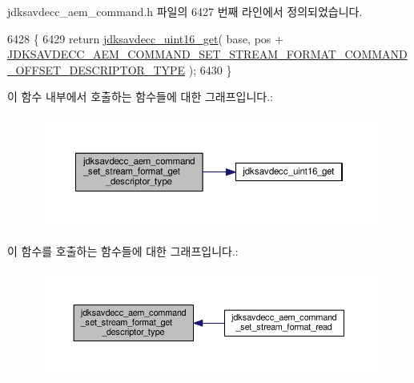 jdksavdecc\+\_\+aem\+\_\+command.\+h 파일의 6427 번째 라인에서 정의되었습니다.


\begin{DoxyCode}
6428 \{
6429     \textcolor{keywordflow}{return} \hyperlink{group__endian_ga3fbbbc20be954aa61e039872965b0dc9}{jdksavdecc\_uint16\_get}( base, pos + 
      \hyperlink{group__command__set__stream__format_ga25da528fd42f5ef79193b65ef514b56c}{JDKSAVDECC\_AEM\_COMMAND\_SET\_STREAM\_FORMAT\_COMMAND\_OFFSET\_DESCRIPTOR\_TYPE}
       );
6430 \}
\end{DoxyCode}


이 함수 내부에서 호출하는 함수들에 대한 그래프입니다.\+:
\nopagebreak
\begin{figure}[H]
\begin{center}
\leavevmode
\includegraphics[width=350pt]{group__command__set__stream__format_ga50d425d359f8e2d68522525d21783cb4_cgraph}
\end{center}
\end{figure}




이 함수를 호출하는 함수들에 대한 그래프입니다.\+:
\nopagebreak
\begin{figure}[H]
\begin{center}
\leavevmode
\includegraphics[width=350pt]{group__command__set__stream__format_ga50d425d359f8e2d68522525d21783cb4_icgraph}
\end{center}
\end{figure}


